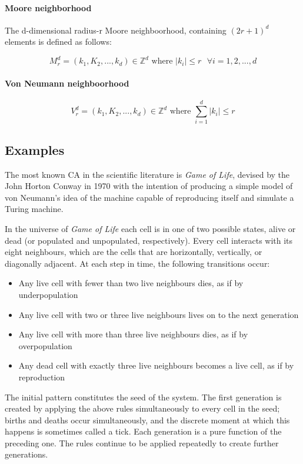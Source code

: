 \paragraph{Moore neighborhood}

The d-dimensional radius-r Moore neighboorhood, containing $(2r +1)^d$ elements is defined as follows:

$$M_r^d = (k_1, K_2,...,k_d) \in \mathds{Z}^d \text{ where } |k_i| \leq r \text{  } \forall i = 1,2,...,d $$ 

\paragraph{Von Neumann neighboorhood}


$$V_r^d = (k_1, K_2,...,k_d) \in \mathds{Z}^d \text{ where } \sum_{i=1}^{d} |k_i| \leq r$$



\subsection{Examples}

\par
The most known CA in the scientific literature is \textit{Game of Life}, devised by the John Horton Conway in 1970 with the intention of producing a simple model of von Neumann's idea of the machine capable of reproducing itself and simulate a Turing machine. 
\par
In the universe of \textit{Game of Life} each cell is in one of two possible states, alive or dead (or populated and unpopulated, respectively). Every cell interacts with its eight neighbours, which are the cells that are horizontally, vertically, or diagonally adjacent. At each step in time, the following transitions occur:
\begin{itemize}
	\item Any live cell with fewer than two live neighbours dies, as if by underpopulation
	\item Any live cell with two or three live neighbours lives on to the next generation
	\item Any live cell with more than three live neighbours dies, as if by overpopulation
	\item Any dead cell with exactly three live neighbours becomes a live cell, as if by reproduction
\end{itemize}
\par
The initial pattern constitutes the seed of the system. The first generation is created by applying the above rules simultaneously to every cell in the seed; births and deaths occur simultaneously, and the discrete moment at which this happens is sometimes called a tick. Each generation is a pure function of the preceding one. The rules continue to be applied repeatedly to create further generations. 

